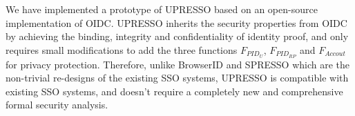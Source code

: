 

We have implemented a prototype of UPRESSO based on an open-source implementation of OIDC.
UPRESSO inherits the security properties from OIDC by achieving the binding, integrity and confidentiality of identity proof,
  and only requires small modifications to add the three functions $F_{PID_{U}}$, $F_{PID_{RP}}$ and $F_{Accout}$ for privacy protection.
Therefore,
 unlike  BrowserID and SPRESSO which are the non-trivial re-designs of the existing SSO systems,
UPRESSO is compatible with existing SSO systems,
 and doesn't require a completely new and comprehensive formal security analysis.









